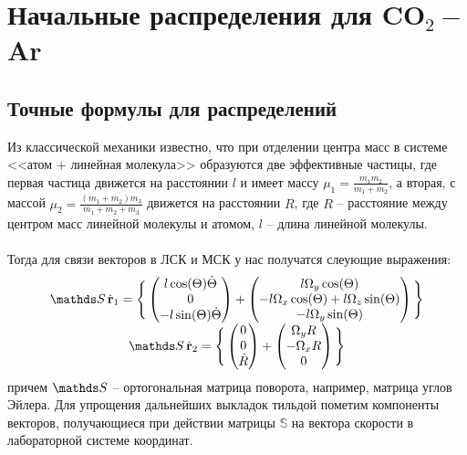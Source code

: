 \section{Начальные распределения для CO$_2-$Ar}
\subsection{Точные формулы для распределений}

Из классической механики известно, что при отделении центра масс в системе <<атом + линейная молекула>> образуются две эффективные частицы, где первая частица движется на расстоянии $l$ и имеет массу $\mu_1=\frac{m_1 m_2}{m_1+m_2}$, а вторая, с массой $\mu_2 = \frac{(m_1+m_2)m_3}{m_1+m_2+m_3}$ движется на расстоянии $R$, где $R$ -- расстояние между центром масс линейной молекулы и атомом, $l$ -- длина линейной молекулы.\\
\\
Тогда для связи векторов в ЛСК и МСК у нас получатся слеующие выражения:
\begin{equation}
\label{eq:relation_mol_lab}
\begin{array}{c}
\bbS \, \dot{\mf{r}}_1 = 
 \Bigg\{ \left( \begin{matrix}
l \cos (\Theta )\dot \Theta\\ 
0\\
-l \sin (\Theta) \dot \Theta
\end{matrix}  \right) + 
\left( \begin{matrix}
l\Omega_y \cos (\Theta) \\ 
-l\Omega_x \cos(\Theta) + l\Omega_z \sin(\Theta)\\
-l\Omega_y \sin(\Theta)
\end{matrix}  \right) \Bigg\}\\
\bbS \, \dot{\mf r}_2 =  \Bigg\{ \left( \begin{matrix}
0\\ 
0\\
\dot R
\end{matrix}  \right) + 
\left( \begin{matrix}
\Omega_y R\\ 
-\Omega_x R\\
0
\end{matrix}  \right) \Bigg\}
\end{array}
\end{equation}
причем $\bbS$ -- ортогональная матрица поворота, например, матрица углов Эйлера. 
Для упрощения дальнейших выкладок тильдой пометим компоненты векторов, получающиеся при действии матрицы $\mathbb{S}$ на вектора скорости в лабораторной системе координат.

